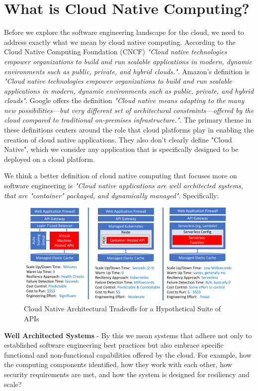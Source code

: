 \documentclass[conference]{IEEEtran}
\begin{document}
\section{What is Cloud Native Computing?}
\label{sec:WhatIsCNF}
Before we explore the software engineering landscape for the cloud, we need to address exactly what we mean by cloud native computing.  According to the Cloud Native Computing Foundation (CNCF)\cite{CNCFHome}  \textit{"Cloud native technologies empower organizations to build and run scalable applications in modern, dynamic environments such as public, private, and hybrid clouds."}.  Amazon's definition is \textit{"Cloud native technologies empower organizations to build and run scalable applications in modern, dynamic environments such as public, private, and hybrid clouds"}. Google offers the definition \textit{"Cloud native means adapting to the many new possibilities—but very different set of architectural constraints—offered by the cloud compared to traditional on-premises infrastructure."}.  The primary theme in these definitions centers around the role that cloud platforms play in enabling the creation of cloud native applications.  They also don't clearly define "Cloud Native", which we consider any application that is specifically designed to be deployed on a cloud platform. 

We think a better definition of cloud native computing that focuses more on  software engineering is \textit{"Cloud native applications are well architected systems, that are "container" packaged, and dynamically managed"}. Specifically:

\begin{figure}[t]
	\includegraphics[width=\textwidth]{images/APIPackageTradoffs}	
	\caption{Cloud Native Architectural Tradeoffs for a Hypothetical Suite of APIs}
	\label{fig:CloudQATradeoffs}
\end{figure}

\textbf{Well Architected Systems} - By this we mean systems that adhere not only to established software engineering best practices but also embrace specific functional and non-functional capabilities offered by the cloud. For example, how the computing components identified, how they work with each other, how security requirements are met, and how the system is designed for resiliency and scale?
\end{document}
